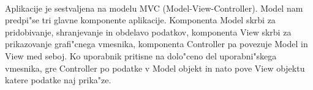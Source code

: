 \paragraph{}Aplikacije je sestvaljena na modelu MVC\cite{mvc-wiki} (Model-View-Controller). Model nam predpi"se tri glavne komponente aplikacije. Komponenta Model skrbi za pridobivanje, shranjevanje in obdelavo podatkov, komponenta View skrbi za prikazovanje grafi"cnega vmesnika, komponenta Controller pa povezuje Model in View med seboj. Ko uporabnik pritisne na dolo"ceno del uporabni"skega vmesnika, gre Controller po podatke v Model objekt in nato pove View objektu katere podatke naj prika"ze. 
